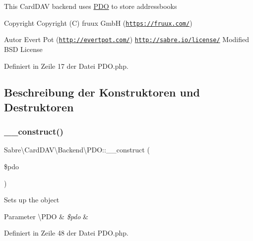 This Card\+D\+AV backend uses \mbox{\hyperlink{class_sabre_1_1_card_d_a_v_1_1_backend_1_1_p_d_o}{P\+DO}} to store addressbooks

\begin{DoxyCopyright}{Copyright}
Copyright (C) fruux GmbH (\href{https://fruux.com/}{\tt https\+://fruux.\+com/}) 
\end{DoxyCopyright}
\begin{DoxyAuthor}{Autor}
Evert Pot (\href{http://evertpot.com/}{\tt http\+://evertpot.\+com/})  \href{http://sabre.io/license/}{\tt http\+://sabre.\+io/license/} Modified B\+SD License 
\end{DoxyAuthor}


Definiert in Zeile 17 der Datei P\+D\+O.\+php.



\subsection{Beschreibung der Konstruktoren und Destruktoren}
\mbox{\label{class_sabre_1_1_card_d_a_v_1_1_backend_1_1_p_d_o_ae66e92f8fd4672c81afbcb1a32c46154}} 
\subsubsection{\texorpdfstring{\+\_\+\+\_\+construct()}{\_\_construct()}}
{\footnotesize\ttfamily Sabre\textbackslash{}\+Card\+D\+A\+V\textbackslash{}\+Backend\textbackslash{}\+P\+D\+O\+::\+\_\+\+\_\+construct (\begin{DoxyParamCaption}\item[{\textbackslash{}\mbox{\hyperlink{class_sabre_1_1_card_d_a_v_1_1_backend_1_1_p_d_o}{P\+DO}}}]{\$pdo }\end{DoxyParamCaption})}

Sets up the object


\begin{DoxyParams}[1]{Parameter}
\textbackslash{}\+P\+DO & {\em \$pdo} & \\
\hline
\end{DoxyParams}


Definiert in Zeile 48 der Datei P\+D\+O.\+php.




